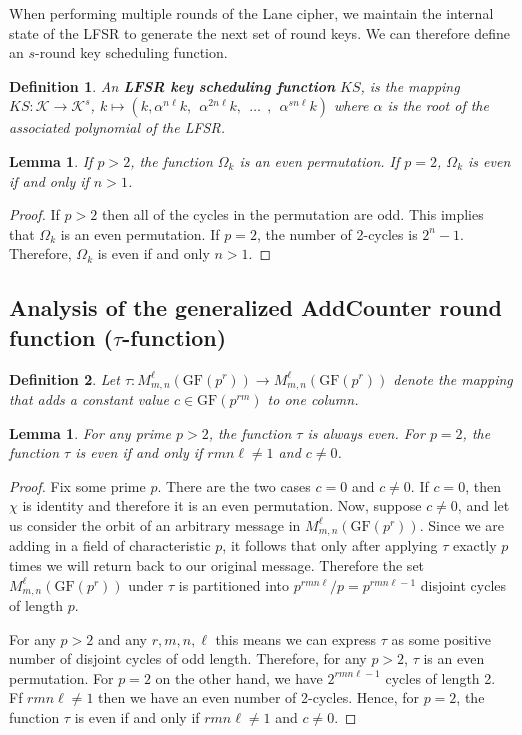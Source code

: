 \documentclass[11pt]{amsart}
\newcommand{\KK}{\mathcal{K}}
\newcommand{\GF}{\mathrm{GF}}
\newtheorem{definition}{{\bf Definition}}
\newtheorem{lemma}[theorem]{{\bf Lemma }}
\begin{document}
When performing multiple rounds of the Lane cipher, we maintain the internal state of the LFSR to generate the next set of round keys. We can therefore define an $s$-round key scheduling function.

\begin{definition}\label{LFSRKS}
An {\bf LFSR key scheduling function} $KS$, is the mapping $KS : \KK \rightarrow \KK^s$, $k \mapsto (k, \alpha^{n\ell}k,~~ \alpha^{2n\ell}k,~~ \dots ~~, ~~ \alpha^{sn\ell}k)$ where $\alpha$ is the root of the associated polynomial of the LFSR.
\end{definition}

\begin{lemma}
If $p>2$, the function $\Omega_k$ is an even permutation. If $p=2$, $\Omega_k$ is even if and only if $n > 1$.
\end{lemma}

\begin{proof}
If $p > 2$ then all of the cycles in the permutation are odd. This implies that $\Omega_k$ is an even permutation. If $p = 2$, the number of 2-cycles is $2^n - 1$. Therefore, $\Omega_k$ is even if and only $n > 1$.
\end{proof}




\subsection{{\bf Analysis of the generalized AddCounter round function} ($\tau$-function) }

\begin{definition}
Let $\tau : M^\ell_{m,n}(\GF(p^r)) \to M^\ell_{m,n}(\GF(p^r))$ denote the mapping that adds a constant value $c \in \GF(p^{rm})$ to one column.
\end{definition}

\begin{lemma}
For any prime $p>2$, the function $\tau$ is always even. For $p=2$, the function $\tau$ is even if and only if $rmn\ell \neq 1$ and $c \neq 0$.
\end{lemma}
\begin{proof}
Fix some prime $p$. There are the two cases $c = 0$ and $c \neq 0$. If $c = 0$, then $\chi$ is identity and therefore it is an even permutation. Now, suppose $c \neq 0$, and let us consider the orbit of an arbitrary message in $M^\ell_{m,n}(\GF(p^r))$. Since we are adding in a field of characteristic $p$, it follows that only after applying $\tau$ exactly $p$ times we will return back to our original message. Therefore the set $M^\ell_{m,n}(\GF(p^r))$ under $\tau$ is partitioned into $p^{rmn\ell} / p = p^{rmn\ell - 1}$ disjoint cycles of length $p$.

For any $p>2$ and any $r,m,n,\ell$ this means we can express $\tau$ as some positive number of disjoint cycles of odd length. Therefore, for any $p>2$, $\tau$ is an even permutation. For $p=2$ on the other hand, we have $2^{rmn\ell - 1}$ cycles of length 2. Ff $rmn\ell \neq 1$ then we have an even number of 2-cycles. Hence, for $p=2$, the function $\tau$ is even if and only if $rmn\ell \neq 1$ and $c \neq 0$.
\end{proof}
\end{document}
